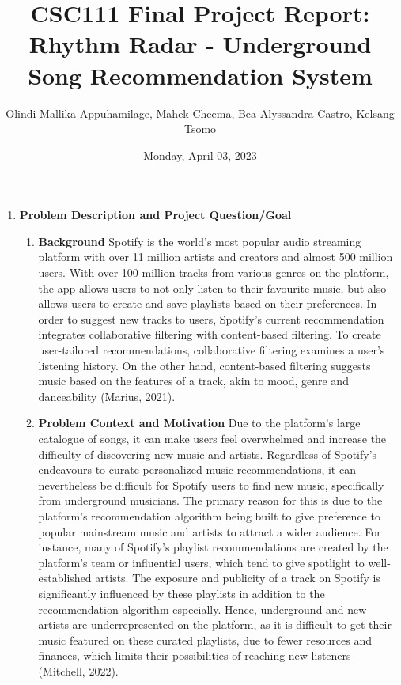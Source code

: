 \documentclass[fontsize=11pt]{article}
\title{CSC111 Final Project Report: Rhythm Radar - Underground Song Recommendation System}
\author{Olindi Mallika Appuhamilage, Mahek Cheema, Bea Alyssandra Castro, Kelsang Tsomo}
\date{Monday, April 03, 2023}
\begin{document}
\maketitle

\begin{enumerate}
\item \textbf{Problem Description and Project Question/Goal}
    \begin{enumerate}
    \item \textbf{Background} \newline
    Spotify is the world’s most popular audio streaming platform with over 11 million artists and creators and almost 500 million users. With over 100 million tracks from various genres on the platform, the app allows users to not only listen to their favourite music, but also allows users to create and save playlists based on their preferences. In order to suggest new tracks to users, Spotify’s current recommendation integrates collaborative filtering with content-based filtering. To create user-tailored recommendations, collaborative filtering examines a user's listening history. On the other hand, content-based filtering suggests music based on the features of a track, akin to mood, genre and danceability (Marius, 2021).  \newline

    \item\textbf{Problem Context and Motivation} \newline
    Due to the platform’s large catalogue of songs, it can make users feel overwhelmed and increase the difficulty of discovering new music and artists. Regardless of Spotify’s endeavours to curate personalized music recommendations, it can nevertheless be difficult for Spotify users to find new music, specifically from underground musicians. The primary reason for this is due to the platform’s recommendation algorithm being built to give preference to popular mainstream music and artists to attract a wider audience. For instance, many of Spotify’s playlist recommendations are created by the platform’s team or influential users, which tend to give spotlight to well-established artists. The exposure and publicity of a track on Spotify is significantly influenced by these playlists in addition to the recommendation algorithm especially. Hence, underground and new artists are underrepresented on the platform, as it is difficult to get their music featured on these curated playlists, due to fewer resources and finances, which limits their possibilities of reaching new listeners (Mitchell, 2022). \newline
    

\end{enumerate}
\end{enumerate}
\end{document}
